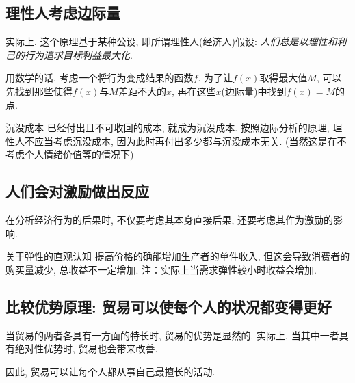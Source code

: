 \subsection*{理性人考虑边际量}

实际上, 这个原理基于某种公设, 即所谓理性人(经济人)假设: \textit{人们总是以理性和利己的行为追求目标利益最大化}. 

用数学的话, 考虑一个将行为变成结果的函数$f$. 为了让$f(x)$取得最大值$M$, 可以先找到那些使得$f(x)$与$M$差距不大的$x$, 再在这些$x$(边际量)中找到$f(x)=M$的点. 

\begin{example}{沉没成本}
	已经付出且不可收回的成本, 就成为沉没成本. 按照边际分析的原理, 理性人不应当考虑沉没成本, 因为此时再付出多少都与沉没成本无关. (当然这是在不考虑个人情绪价值等的情况下)
\end{example}

\subsection*{人们会对激励做出反应}

在分析经济行为的后果时, 不仅要考虑其本身直接后果, 还要考虑其作为激励的影响. 

\begin{example}{关于弹性的直观认知}
	提高价格的确能增加生产者的单件收入, 但这会导致消费者的购买量减少, 总收益不一定增加. 注：实际上当需求弹性较小时收益会增加. 
\end{example}

\subsection*{比较优势原理: 贸易可以使每个人的状况都变得更好}

当贸易的两者各具有一方面的特长时, 贸易的优势是显然的. 实际上, 当其中一者具有绝对性优势时, 贸易也会带来改善. 





因此, 贸易可以让每个人都从事自己最擅长的活动. 















